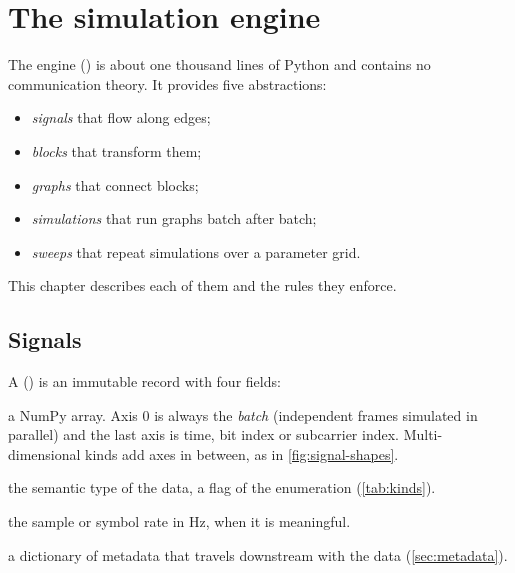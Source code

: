 \chapter{The simulation engine}\label{ch:engine}

The engine () is about one thousand lines of Python and contains no
communication theory. It provides five abstractions:
\begin{itemize}
  \item \emph{signals} that flow along edges;
  \item \emph{blocks} that transform them;
  \item \emph{graphs} that connect blocks;
  \item \emph{simulations} that run graphs batch after batch;
  \item \emph{sweeps} that repeat simulations over a parameter grid.
\end{itemize}
This chapter describes each of them and the rules they enforce.

\section{Signals}\label{sec:signal}
A  () is an immutable record with four fields:
\begin{description}[font=\ttfamily\color{accent}]
  \item[data] a NumPy array. Axis 0 is always the \emph{batch} (independent frames simulated in
  parallel) and the last axis is time, bit index or subcarrier index. Multi-dimensional kinds
  add axes in between, as in \cref{fig:signal-shapes}.
  \item[kind] the semantic type of the data, a flag of the  enumeration
  (\cref{tab:kinds}).
  \item[fs] the sample or symbol rate in Hz, when it is meaningful.
  \item[meta] a dictionary of metadata that travels downstream with the data (\cref{sec:metadata}).
\end{description}

